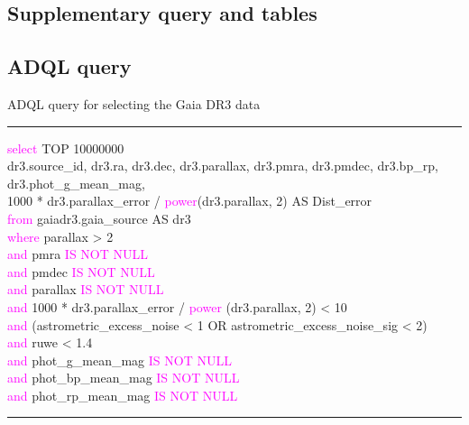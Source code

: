 \documentclass{aa}
\begin{document}
\begin{appendix}

\section{Supplementary query and tables}\label{Appendix:Appendix_B}

\subsection{ADQL query} \label{sec:adql}

ADQL query for selecting the Gaia DR3 data

    

\noindent\rule[0.5ex]{\linewidth}{0.5pt}
{\footnotesize {\selectfont
\noindent 
\textcolor{magenta}{select} TOP 10000000
\\dr3.source\_id, dr3.ra, dr3.dec, dr3.parallax, dr3.pmra, dr3.pmdec,  dr3.bp\_rp, dr3.phot\_g\_mean\_mag, \\ 1000 * dr3.parallax\_error / \textcolor{magenta}{power}(dr3.parallax, 2) AS Dist\_error
\\\textcolor{magenta}{from} gaiadr3.gaia\_source AS dr3 \\
\textcolor{magenta}{where}
    parallax > 2 \\
    \textcolor{magenta}{and} pmra \textcolor{magenta}{IS NOT NULL} \\
    \textcolor{magenta}{and} pmdec \textcolor{magenta}{IS NOT NULL}  \\
    \textcolor{magenta}{and} parallax \textcolor{magenta}{IS NOT NULL}  \\
    \textcolor{magenta}{and} 1000 * dr3.parallax\_error / 
        \textcolor{magenta}{power} (dr3.parallax, 2) < 10 \\
    \textcolor{magenta}{and} (astrometric\_excess\_noise < 1 
        OR astrometric\_excess\_noise\_sig < 2)\\
    \textcolor{magenta}{and} ruwe < 1.4\\
    \textcolor{magenta}{and} phot\_g\_mean\_mag \textcolor{magenta}{IS NOT NULL} \\
    \textcolor{magenta}{and} phot\_bp\_mean\_mag \textcolor{magenta}{IS NOT NULL} \\
    \textcolor{magenta}{and} phot\_rp\_mean\_mag \textcolor{magenta}{IS NOT NULL} \\

\noindent\rule[0.5ex]{\linewidth}{0.5pt}
}}    



\end{appendix}
\end{document}
